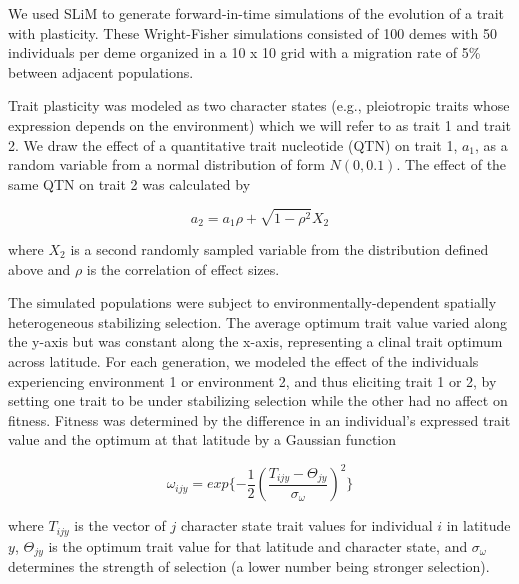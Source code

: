 \documentclass[11pt,letterpaper]{article}
\begin{document}


We used SLiM \citep{haller2025slim} to generate forward-in-time simulations of the evolution of a trait with plasticity. These Wright-Fisher simulations consisted of 100 demes with 50 individuals per deme organized in a 10 x 10 grid with a migration rate of 5\% between adjacent populations. 

Trait plasticity was modeled as two character states (e.g., pleiotropic traits whose expression depends on the environment) which we will refer to as trait 1 and trait 2. We draw the effect of a quantitative trait nucleotide (QTN) on trait 1, $a_1$, as a random variable from a normal distribution of form $N(0,0.1)$. The effect of the same QTN on trait 2 was calculated by

\begin{equation}
    a_2 = a_{1}\rho + \sqrt{1 - \rho^2}X_2
\end{equation}

where $X_2$ is a second randomly sampled variable from the distribution defined above and $\rho$ is the correlation of effect sizes. 

The simulated populations were subject to environmentally-dependent spatially heterogeneous stabilizing selection. 
The average optimum trait value varied along the y-axis but was constant along the x-axis, representing a clinal trait optimum across latitude.
For each generation, we modeled the effect of the individuals experiencing environment 1 or environment 2, and thus eliciting trait 1 or 2, by setting one trait to be under stabilizing selection while the other had no affect on fitness. 
Fitness was determined by the difference in an individual's expressed trait value and the optimum at that latitude by a Gaussian function

\begin{equation}
    \omega_{ijy} = exp\{-\frac{1}{2}(\frac{T_{ijy} - \Theta_{jy}}{\sigma_\omega})^2\}
\end{equation}

where $T_{ijy}$ is the vector of $j$ character state trait values for individual $i$ in latitude $y$, $\Theta_{jy}$ is the optimum trait value for that latitude and character state, and $\sigma_\omega$ determines the strength of selection (a lower number being stronger selection).
\end{document}
